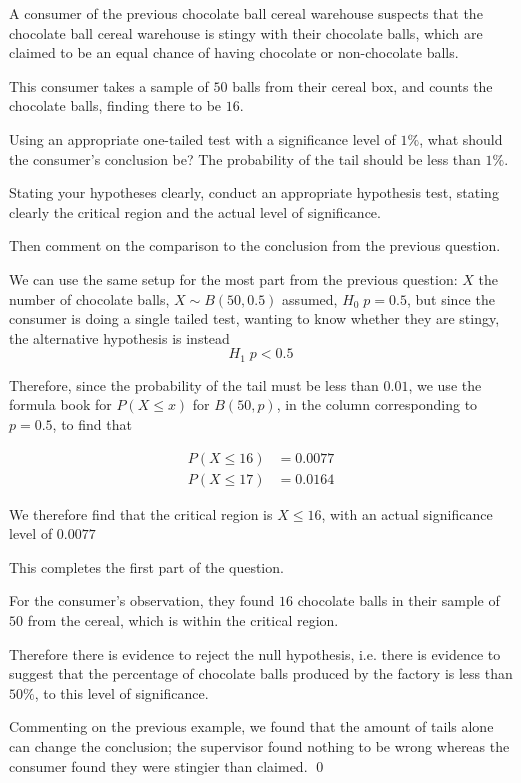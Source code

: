 \begin{example}
    A consumer of the previous chocolate ball cereal warehouse suspects that the chocolate ball cereal warehouse is stingy with their chocolate balls, which are claimed to be an equal chance of having chocolate or non-chocolate balls.

    This consumer takes a sample of $50$ balls from their cereal box, and counts the chocolate balls, finding there to be $16$.

    Using an appropriate one-tailed test with a significance level of $1\%$, what should the consumer's conclusion be? The probability of the tail should be less than $1\%$.

    Stating your hypotheses clearly, conduct an appropriate hypothesis test, stating clearly the critical region and the actual level of significance.

    Then comment on the comparison to the conclusion from the previous question.
\end{example}
\begin{solution}
    We can use the same setup for the most part from the previous question: $X$ the number of chocolate balls, $X \sim B(50,0.5)$ assumed, $H_0\;p=0.5$, but since the consumer is doing a single tailed test, wanting to know whether they are stingy, the alternative hypothesis is instead 
    \[ H_1\;p<0.5 \]

    Therefore, since the probability of the tail must be less than $0.01$, we use the formula book for $P(X\leq x)$ for $B(50,p)$, in the column corresponding to $p=0.5$, to find that 
    
    \begin{align*}
        P(X \leq 16) &= 0.0077 \\
        P(X \leq 17) &= 0.0164
    \end{align*}

    We therefore find that the critical region is $X\leq 16$, with an actual significance level of $0.0077$

    This completes the first part of the question.

    For the consumer's observation, they found $16$ chocolate balls in their sample of $50$ from the cereal, which is within the critical region.

    Therefore there is evidence to reject the null hypothesis, i.e. there is evidence to suggest that the percentage of chocolate balls produced by the factory is less than $50\%$, to this level of significance.

    Commenting on the previous example, we found that the amount of tails alone can change the conclusion; the supervisor found nothing to be wrong whereas the consumer found they were stingier than claimed.
    \qed
\end{solution}


